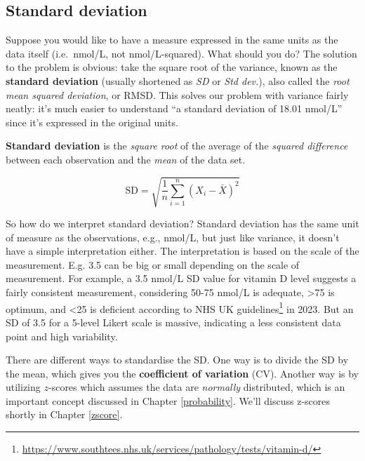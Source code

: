 \documentclass[
  11pt,
  a4paper,
  twoside,symmetric,openright]{book}
\theoremstyle{break}
\theoremstyle{break}
\begin{document}
\subsection{Standard deviation}\label{sd}

Suppose you would like to have a measure expressed in the same units as the data itself (i.e.~nmol/L, not nmol/L-squared). What should you do? The solution to the problem is obvious: take the square root of the variance, known as the \textbf{standard deviation} (usually shortened as \emph{SD} or \emph{Std dev.}), also called the \emph{root mean squared deviation}, or RMSD. This solves our problem with variance fairly neatly: it's much easier to understand ``a standard deviation of 18.01 nmol/L'' since it's expressed in the original units.

\begin{definition}
\protect\hypertarget{def:defSD}{}\label{def:defSD}\textbf{Standard deviation} is the \emph{square root} of the average of the \emph{squared difference} between each observation and the \emph{mean} of the data set.

\[
\mbox{SD} = \sqrt{ \frac{1}{n} \sum_{i=1}^n \left( X_i - \bar{X} \right)^2 }
\]
\end{definition}

So how do we interpret standard deviation? Standard deviation has the same unit of measure as the observations, e.g., nmol/L, but just like variance, it doesn't have a simple interpretation either. The interpretation is based on the scale of the measurement. E.g. 3.5 can be big or small depending on the scale of measurement. For example, a 3.5 nmol/L SD value for vitamin D level suggests a fairly consistent measurement, considering 50-75 nmol/L is adequate, \textgreater75 is optimum, and \textless25 is deficient according to NHS UK guidelines\footnote{\url{https://www.southtees.nhs.uk/services/pathology/tests/vitamin-d/}} in 2023. But an SD of 3.5 for a 5-level Likert scale is massive, indicating a less consistent data point and high variability.

There are different ways to standardise the SD. One way is to divide the SD by the mean, which gives you the \textbf{coefficient of variation} (CV). Another way is by utilizing \(z\)-scores which assumes the data are \emph{normally} distributed, which is an important concept discussed in Chapter \ref{probability}. We'll discuss z-scores shortly in Chapter \ref{zscore}.
\end{document}

